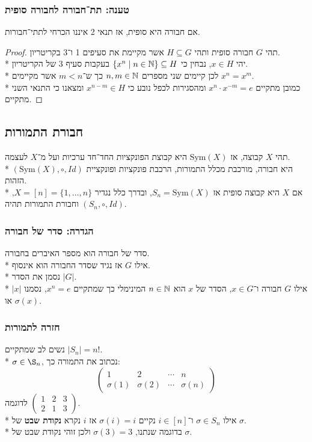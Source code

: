 \subsubsection{טענה: תת־חבורה לחבורה סופית}
אם חבורה היא סופית, אז תנאי 2 איננו הכרחי לתתי־חבורות.
\begin{proof}
	תהי $G$ חבורה סופית ותהי $H \subseteq G$ אשר מקיימת את סעיפים 1 ו־3 בקריטריון. \\*
	יהי $x \in H$, נבחין כי $\{ x^n \mid n \in \mathbb{N} \} \subseteq H$ בעקבות סעיף 3 של הקריטריון. \\*
	לכן קיימים שני מספרים $n, m \in \mathbb{N}$ כך ש־$m < n$ אשר מקיימים $x^n = x^m$. \\*
	כמובן מתקיים $x^n \cdot x^{-m} = e$ ומהסגירות לכפל נובע כי $x^{n - m} \in H$ ומצאנו כי התנאי השני מתקיים.
\end{proof}

\subsection{חבורת התמורות}
תהי $X$ קבוצה, אז $\text{Sym}(X)$ היא קבוצת הפונקציות החד־חד ערכיות ועל מ־$X$ לעצמה. \\*
$(\text{Sym}(X), \circ, Id)$ היא חבורה, מורכבת מכלל התמורות, הרכבת פונקציות ופונקציית הזהות. \\*
אם $X$ היא קבוצה סופית אז $S_n = \text{Sym}(X)$, ובדרך כלל נגדיר $X = [n] = \{1, \hdots, n\}$, וחבורת התמורות תהיה $(S_n, \circ, Id)$.

\subsubsection{הגדרה: סדר של חבורה}
סדר של חבורה הוא מספר האיברים בחבורה. \\*
אילו $G$ אז נגיד שסדר החבורה הוא אינסוף. \\*
נסמן את הסדר $|G|$. \\*
אילו $G$ חבורה ו־$x \in G$, הסדר של $x$ הוא $n \in \mathbb{N}$ המינימלי כך שמתקיים $x^n = e$, נסמנו $|x|$ או $\sigma(x)$.

\subsubsection{חזרה לתמורות}
נשים לב שמתקיים $|S_n| = n !$. \\* %
$\sigma \in \S_n$, נכתוב את התמורה כך:
\[
	\begin{pmatrix}
		1 & 2 & \cdots & n \\
		\sigma(1) & \sigma(2) & \cdots & \sigma(n)
	\end{pmatrix}
\]
לדוגמה $\begin{pmatrix}
	1 & 2 & 3 \\
	2 & 1 & 3
\end{pmatrix}$. \\*
אילו $\sigma \in S_n$ ו־$i \in [n]$ נקיים $\sigma(i) = i$ אז $i$ נקרא \textbf{נקודת שבט} של $\sigma$. \\*
בדוגמה שנתנו, $\sigma(3) = 3$ ולכן זוהי נקודת שבט של $\sigma$.


